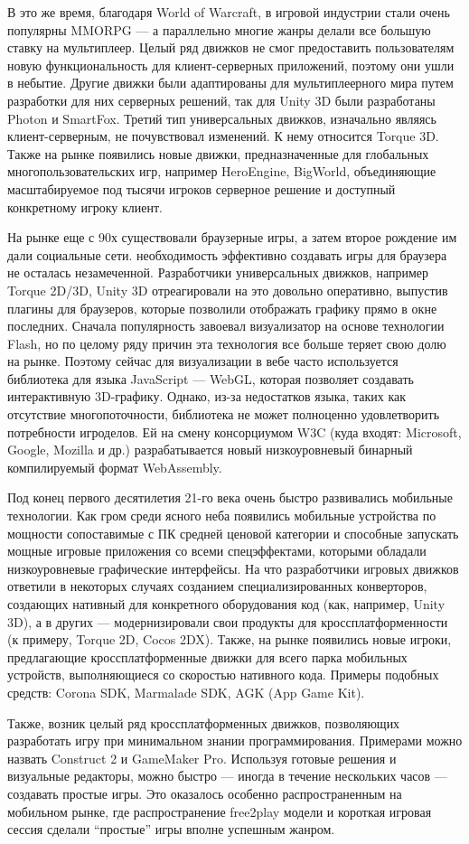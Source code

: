 В это же время, благодаря World of Warcraft, в игровой индустрии стали очень популярны MMORPG — а параллельно многие жанры делали все большую ставку на мультиплеер. Целый ряд движков не смог предоставить пользователям новую функциональность для клиент-серверных приложений, поэтому они ушли в небытие. Другие движки были адаптированы для мультиплеерного мира путем разработки для них серверных решений, так для Unity 3D были разработаны Photon и SmartFox. Третий тип универсальных движков, изначально являясь клиент-серверным, не почувствовал изменений. К нему относится Torque 3D. Также на рынке появились новые движки, предназначенные для глобальных многопользовательских игр, например HeroEngine, BigWorld, объединяющие масштабируемое под тысячи игроков серверное решение и доступный конкретному игроку клиент.

На рынке еще с 90х существовали браузерные игры, а затем второе рождение им дали социальные сети. необходимость эффективно создавать игры для браузера не осталась незамеченной. Разработчики универсальных движков, например Torque 2D/3D, Unity 3D отреагировали на это довольно оперативно, выпустив плагины для браузеров, которые позволили отображать графику прямо в окне последних. Сначала популярность завоевал визуализатор на основе технологии Flash, но по целому ряду причин эта технология все больше теряет свою долю на рынке. Поэтому сейчас для визуализации в вебе часто используется библиотека для языка JavaScript — WebGL, которая позволяет создавать интерактивную 3D-графику. Однако, из-за недостатков языка, таких как отсутствие многопоточности, библиотека не может полноценно удовлетворить потребности игроделов. Ей на смену консорциумом W3C (куда входят: Microsoft, Google, Mozilla и др.) разрабатывается новый низкоуровневый бинарный компилируемый формат WebAssembly.

Под конец первого десятилетия 21-го века очень быстро развивались мобильные технологии. Как гром среди ясного неба появились мобильные устройства по мощности сопоставимые с ПК средней ценовой категории и способные запускать мощные игровые приложения со всеми спецэффектами, которыми обладали низкоуровневые графические интерфейсы. На что разработчики игровых движков ответили в некоторых случаях созданием специализированных конверторов, создающих нативный для конкретного оборудования код (как, например, Unity 3D), а в других — модернизировали свои продукты для кроссплатформенности (к примеру, Torque 2D, Cocos 2DX). Также, на рынке появились новые игроки, предлагающие кроссплатформенные движки для всего парка мобильных устройств, выполняющиеся со скоростью нативного кода. Примеры подобных средств: Corona SDK, Marmalade SDK, AGK (App Game Kit).

Также, возник целый ряд кроссплатформенных движков, позволяющих разработать игру при минимальном знании программирования. Примерами можно назвать Construct 2 и GameMaker Pro. Используя готовые решения и визуальные редакторы, можно быстро — иногда в течение нескольких часов — создавать простые игры. Это оказалось особенно распространенным на мобильном рынке, где распространение free2play модели и короткая игровая сессия сделали “простые” игры вполне успешным жанром.
